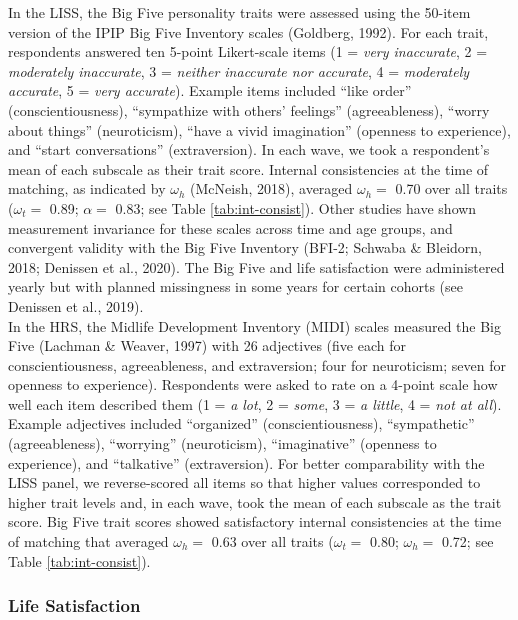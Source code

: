 \documentclass[
  english,
  man,floatsintext]{apa7}
\begin{document}
In the LISS, the Big Five personality traits were assessed using the 50-item version of the IPIP Big Five Inventory scales (Goldberg, 1992). For each trait, respondents answered ten 5-point Likert-scale items (1 = \emph{very inaccurate}, 2 = \emph{moderately inaccurate}, 3 = \emph{neither inaccurate nor accurate}, 4 = \emph{moderately accurate}, 5 = \emph{very accurate}). Example items included \enquote{like order} (conscientiousness), \enquote{sympathize with others' feelings} (agreeableness), \enquote{worry about things} (neuroticism), \enquote{have a vivid imagination} (openness to experience), and \enquote{start conversations} (extraversion). In each wave, we took a respondent's mean of each subscale as their trait score. Internal consistencies at the time of matching, as indicated by \(\omega_h\) (McNeish, 2018), averaged \(\omega_h =\) 0.70 over all traits (\(\omega_t =\) 0.89; \(\alpha =\) 0.83; see Table \ref{tab:int-consist}). Other studies have shown measurement invariance for these scales across time and age groups, and convergent validity with the Big Five Inventory (BFI-2; Schwaba \& Bleidorn, 2018; Denissen et al., 2020). The Big Five and life satisfaction were administered yearly but with planned missingness in some years for certain cohorts (see Denissen et al., 2019). \\
In the HRS, the Midlife Development Inventory (MIDI) scales measured the Big Five (Lachman \& Weaver, 1997) with 26 adjectives (five each for conscientiousness, agreeableness, and extraversion; four for neuroticism; seven for openness to experience). Respondents were asked to rate on a 4-point scale how well each item described them (1 = \emph{a lot}, 2 = \emph{some}, 3 = \emph{a little}, 4 = \emph{not at all}). Example adjectives included \enquote{organized} (conscientiousness), \enquote{sympathetic} (agreeableness), \enquote{worrying} (neuroticism), \enquote{imaginative} (openness to experience), and \enquote{talkative} (extraversion). For better comparability with the LISS panel, we reverse-scored all items so that higher values corresponded to higher trait levels and, in each wave, took the mean of each subscale as the trait score. Big Five trait scores showed satisfactory internal consistencies at the time of matching that averaged \(\omega_h =\) 0.63 over all traits (\(\omega_t =\) 0.80; \(\omega_h =\) 0.72; see Table \ref{tab:int-consist}).

\hypertarget{life-satisfaction}{%
\subsubsection{Life Satisfaction}\label{life-satisfaction}}
\end{document}
